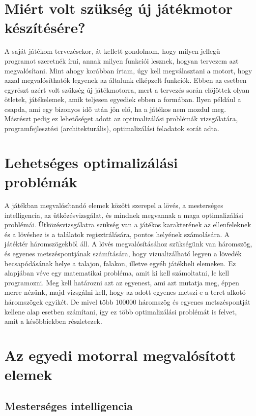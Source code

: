 \section{Miért volt szükség új játékmotor készítésére?}

A saját játékom tervezésekor, át kellett gondolnom, hogy milyen jellegű programot szeretnék írni, annak milyen funkciói lesznek, hogyan tervezem azt megvalósítani. Mint ahogy korábban írtam, úgy kell megválasztani a motort, hogy azzal megvalósíthatók legyenek az általunk elképzelt funkciók. Ebben az esetben egyrészt azért volt szükség új játékmotorra, mert a tervezés során előjöttek olyan ötletek, játékelemek, amik teljesen egyediek ebben a formában. Ilyen például a csapda, ami egy bizonyos idő után jön elő, ha a játékos nem mozdul meg. Másrészt pedig ez lehetőséget adott az optimalizálási problémák vizsgálatára, programfejlesztési (architekturális), optimalizálási feladatok sorát adta.

\section{Lehetséges optimalizálási problémák}

A játékban megvalósítandó elemek között szerepel a lövés, a mesterséges intelligencia, az ütközésvizsgálat, és mindnek megvannak a maga optimalizálási problémái. Ütközésvizsgálatra szükség van a játékos karakterének az ellenfeleknek és a lövéshez is a találatok regisztrálására, pontos helyének számolására. A játéktér háromszögekből áll. A lövés megvalósításához szükségünk van háromszög, és egyenes metszéspontjának számítására, hogy vizualizálható legyen a lövedék becsapódásának helye a talajon, falakon, illetve egyéb játékbeli elemeken. Ez alapjában véve egy matematikai probléma, amit ki kell számoltatni, le kell programozni. Meg kell határozni azt az egyenest, ami azt mutatja meg, éppen merre nézünk, majd vizsgálni kell, hogy az adott egyenes metszi-e a teret alkotó háromszögek egyikét. De mivel több 100000 háromszög és egyenes metszéspontját kellene alap esetben számítani, így ez több optimalizálási problémát is felvet, amit a későbbiekben részletezek.

\section{Az egyedi motorral megvalósított elemek}
\subsection{Mesterséges intelligencia}

